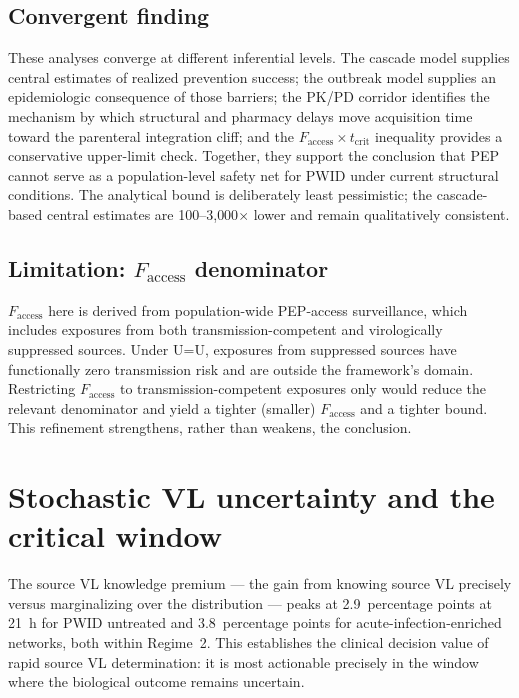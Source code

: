 \documentclass[10pt,letterpaper]{article}
\theoremstyle{definition}
\theoremstyle{remark}
\newcommand{\Faccess}{F_{\text{access}}}
\newcommand{\tcrit}{t_{\text{crit}}}
\begin{document}
\subsection*{Convergent finding}

These analyses converge at different inferential levels. The cascade model supplies central estimates of realized prevention success; the outbreak model supplies an epidemiologic consequence of those barriers; the PK/PD corridor identifies the mechanism by which structural and pharmacy delays move acquisition time toward the parenteral integration cliff; and the $\Faccess \times \tcrit$ inequality provides a conservative upper-limit check. Together, they support the conclusion that PEP cannot serve as a population-level safety net for PWID under current structural conditions. The analytical bound is deliberately least pessimistic; the cascade-based central estimates are 100--3{,}000$\times$ lower and remain qualitatively consistent.

\subsection*{Limitation: $\Faccess$ denominator}

$\Faccess$ here is derived from population-wide PEP-access surveillance, which includes exposures from both transmission-competent and virologically suppressed sources. Under U=U\cite{rodger2019,bavinton2018}, exposures from suppressed sources have functionally zero transmission risk and are outside the framework's domain. Restricting $\Faccess$ to transmission-competent exposures only would reduce the relevant denominator and yield a tighter (smaller) $\Faccess$ and a tighter bound. This refinement strengthens, rather than weakens, the conclusion.


\section*{Stochastic VL uncertainty and the critical window}

The source VL knowledge premium --- the gain from knowing source VL precisely versus marginalizing over the distribution --- peaks at 2.9~percentage points at 21~h for PWID untreated and 3.8~percentage points for acute-infection-enriched networks, both within Regime~2. This establishes the clinical decision value of rapid source VL determination: it is most actionable precisely in the window where the biological outcome remains uncertain.
\end{document}
